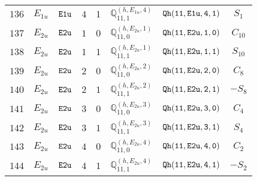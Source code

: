 \documentclass[fleqn,8pt]{jsarticle}
\begin{document}
\begin{table}[ht!]
\begin{center}
\begin{tabular}{cccccccc}
$ 136 $ & $ E_{1u} $ & $ {\tt E1u} $ & $ 4 $ & $ 1 $ & $ \mathbb{Q}_{11,1}^{(h,E_{1u},4)} $ & $ {\tt Qh(11,E1u,4,1)} $ & $ S_{1} $ \\
$ 137 $ & $ E_{2u} $ & $ {\tt E2u} $ & $ 1 $ & $ 0 $ & $ \mathbb{Q}_{11,0}^{(h,E_{2u},1)} $ & $ {\tt Qh(11,E2u,1,0)} $ & $ C_{10} $ \\
$ 138 $ & $ E_{2u} $ & $ {\tt E2u} $ & $ 1 $ & $ 1 $ & $ \mathbb{Q}_{11,1}^{(h,E_{2u},1)} $ & $ {\tt Qh(11,E2u,1,1)} $ & $ S_{10} $ \\
$ 139 $ & $ E_{2u} $ & $ {\tt E2u} $ & $ 2 $ & $ 0 $ & $ \mathbb{Q}_{11,0}^{(h,E_{2u},2)} $ & $ {\tt Qh(11,E2u,2,0)} $ & $ C_{8} $ \\
$ 140 $ & $ E_{2u} $ & $ {\tt E2u} $ & $ 2 $ & $ 1 $ & $ \mathbb{Q}_{11,1}^{(h,E_{2u},2)} $ & $ {\tt Qh(11,E2u,2,1)} $ & $ - S_{8} $ \\
$ 141 $ & $ E_{2u} $ & $ {\tt E2u} $ & $ 3 $ & $ 0 $ & $ \mathbb{Q}_{11,0}^{(h,E_{2u},3)} $ & $ {\tt Qh(11,E2u,3,0)} $ & $ C_{4} $ \\
$ 142 $ & $ E_{2u} $ & $ {\tt E2u} $ & $ 3 $ & $ 1 $ & $ \mathbb{Q}_{11,1}^{(h,E_{2u},3)} $ & $ {\tt Qh(11,E2u,3,1)} $ & $ S_{4} $ \\
$ 143 $ & $ E_{2u} $ & $ {\tt E2u} $ & $ 4 $ & $ 0 $ & $ \mathbb{Q}_{11,0}^{(h,E_{2u},4)} $ & $ {\tt Qh(11,E2u,4,0)} $ & $ C_{2} $ \\
$ 144 $ & $ E_{2u} $ & $ {\tt E2u} $ & $ 4 $ & $ 1 $ & $ \mathbb{Q}_{11,1}^{(h,E_{2u},4)} $ & $ {\tt Qh(11,E2u,4,1)} $ & $ - S_{2} $ \\
 \hline \hline
\end{tabular}
\end{center}
\end{table}
\end{document}
